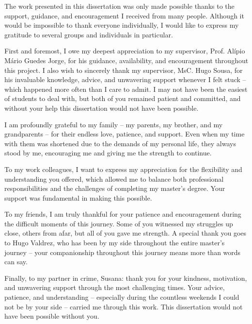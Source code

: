 \begin{acknowledgements}

The work presented in this dissertation was only made possible thanks to the support, guidance, and encouragement I received from many people. Although it would be impossible to thank everyone individually, I would like to express my gratitude to several groups and individuals in particular.  

First and foremost, I owe my deepest appreciation to my supervisor, Prof. Alípio Mário Guedes Jorge, for his guidance, availability, and encouragement throughout this project. I also wish to sincerely thank my supervisor, MsC. Hugo Sousa, for his invaluable knowledge, advice, and unwavering support whenever I felt stuck -- which happened more often than I care to admit. I may not have been the easiest of students to deal with, but both of you remained patient and committed, and without your help this dissertation would not have been possible.  

I am profoundly grateful to my family -- my parents, my brother, and my grandparents -- for their endless love, patience, and support. Even when my time with them was shortened due to the demands of my personal life, they always stood by me, encouraging me and giving me the strength to continue.  

To my work colleagues, I want to express my appreciation for the flexibility and understanding you offered, which allowed me to balance both professional responsibilities and the challenges of completing my master’s degree. Your support was fundamental in making this possible.  

To my friends, I am truly thankful for your patience and encouragement during the difficult moments of this journey. Some of you witnessed my struggles up close, others from afar, but all of you gave me strength. A special thank you goes to Hugo Valdrez, who has been by my side throughout the entire master’s journey -- your companionship throughout this journey means more than words can say.  

Finally, to my partner in crime, Susana: thank you for your kindness, motivation, and unwavering support through the most challenging times. Your advice, patience, and understanding -- especially during the countless weekends I could not be by your side -- carried me through this work. This dissertation would not have been possible without you. 

\end{acknowledgements}


